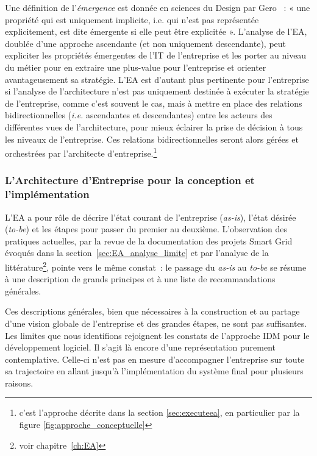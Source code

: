 Une définition de l'\textit{émergence} est donnée en sciences du Design par
Gero \cite{gero1992creativity}~: « une propriété qui est uniquement implicite,
i.e.  qui n'est pas représentée explicitement, est dite émergente si elle peut
être explicitée ». L'analyse de l'EA, doublée d'une approche ascendante (et non
uniquement descendante), peut expliciter les propriétés émergentes de l'IT de
l'entreprise et les porter au niveau du métier pour en extraire une plus-value
pour l'entreprise et orienter avantageusement sa stratégie. L'EA est d'autant
plus pertinente pour l'entreprise si l'analyse de l'architecture n'est pas
uniquement destinée à exécuter la stratégie de l'entreprise, comme c'est
souvent le cas, mais à mettre en place des relations bidirectionnelles
(\textit{i.e.} ascendantes et descendantes) entre les acteurs des différentes
vues de l'architecture, pour mieux éclairer la prise de décision à tous les
niveaux de l'entreprise. Ces relations bidirectionnelles seront alors gérées et
orchestrées par l'architecte d'entreprise.\footnote{c'est l'approche décrite dans la section \ref{sec:executeea}, en particulier par la figure \ref{fig:approche_conceptuelle}}


\subsubsection{L'Architecture d'Entreprise pour la conception et l'implémentation}

L'EA a pour rôle de décrire l'état courant de l'entreprise (\textit{as-is}),
l'état désirée (\textit{to-be}) et les étapes pour passer du premier au
deuxième. L'observation des pratiques actuelles, par la revue de la
documentation des projets Smart Grid évoqués dans la
section~\ref{sec:EA_analyse_limite} et par l'analyse de la
littérature\footnote{voir chapitre~\ref{ch:EA}}, pointe vers le même constat~:
le passage du \textit{as-is} au \textit{to-be} se résume à une description de
grands principes et à une liste de recommandations générales.

Ces descriptions générales, bien que nécessaires à la construction et au
partage d'une vision globale de l'entreprise et des grandes étapes, ne sont pas
suffisantes. Les limites que nous identifions rejoignent les constats de
l'approche IDM pour le développement logiciel. Il s'agit là encore d'une
représentation purement contemplative. Celle-ci n'est pas en mesure
d'accompagner l'entreprise sur toute sa trajectoire en allant jusqu'à
l'implémentation du système final pour plusieurs raisons.

